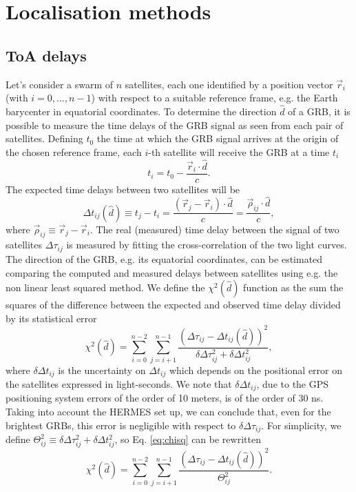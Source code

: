 \documentclass[]{spie}  %
\begin{document}
\section{Localisation methods}

\subsection{ToA delays}

Let's consider a swarm of $n$ satellites, each one identified by a position vector $\vec{r}_i$ (with $i=0,\dots, n-1$) with respect to a suitable reference frame, e.g. the Earth barycenter in equatorial coordinates.
To determine the direction $\hat{d}$ of a GRB, it is possible to measure the time delays of the GRB signal as seen from each pair of  satellites. 
Defining $t_0$ the time at which the GRB signal arrives at the origin of the chosen reference frame, each $i$-th satellite will receive the GRB at a time $t_i$
\begin{equation}
  t_i = t_0 - \frac{\vec{r}_i \cdot \hat{d}}{c}.
\end{equation}
The expected time delays between two satellites will be
\begin{equation}
    \Delta t_{ij}(\hat{d}) \equiv t_j - t_i = \frac{(\vec{r}_j - \vec{r}_i) \cdot \hat{d}}{c} =  \frac{\vec{\rho}_{ij} \cdot \hat{d}}{c},
\label{eq:delayexp}
\end{equation}
where $\vec{\rho}_{ij} \equiv \vec{r}_j - \vec{r}_i$.
The real (measured) time delay between the signal of two satellites $\Delta \tau_{ij}$ is measured by fitting the cross-correlation of the two light curves.
The direction of the GRB, e.g. its equatorial coordinates, can be estimated comparing the computed and measured delays between satellites using e.g. the non linear least squared method.
We define the $\chi^2(\hat{d})$ function as the sum the squares of the difference between the expected and observed time delay divided by its statistical error
  \begin{equation}
    \chi^2(\hat{d}) = \sum_{i = 0}^{n - 2}\sum_{j = i + 1}^{n - 1} \frac{(\Delta \tau_{ij} - \Delta t_{ij}(\hat{d}))^2}{\delta\Delta \tau_{ij}^2 + \delta\Delta t_{ij}^2},
    \label{eq:chisq}
  \end{equation}
where $\delta\Delta t_{ij}$ is the uncertainty on $\Delta t_{ij}$ which depends on the positional error on the satellites expressed in light-seconds.
We note that $\delta\Delta t_{ij}$, due to the GPS positioning system errors of the order of 10 meters, is of the order of 30 ns.
Taking into account the HERMES set up, we can conclude that, even for the brightest GRBs, this error is negligible with respect to $\delta\Delta \tau_{ij}$.
For simplicity, we define $\Theta_{ij}^2 \equiv \delta\Delta \tau_{ij}^2 + \delta\Delta t_{ij}^2$, so Eq. \ref{eq:chisq} can be rewritten
\begin{equation}
    \chi^2(\hat{d}) = \sum_{i = 0}^{n - 2}\sum_{j = i + 1}^{n - 1} \frac{(\Delta \tau_{ij} - \Delta t_{ij}(\hat{d}))^2}{\Theta_{ij}^2}.
    \label{eq:chisq_2}
  \end{equation}
  
\end{document}
